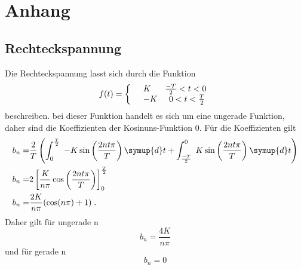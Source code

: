\section{Anhang}
\label{sec:Anhang}
\subsection{Rechteckspannung}
\label{sec:Rechteckspannung}
Die Rechteckspannung lasst sich durch die Funktion
\begin{equation*}
  f(t)=\left\{
  \begin{array}{l l}
    &K   \;\;\;\;\;\;\frac{-T}{2}<t<0 \\
    &-K  \;\;\;\;\;0<t<\frac{T}{2}
  \end{array}
  \right.
\end{equation*}
beschreiben. bei dieser Funktion handelt es sich um eine ungerade Funktion, daher
sind die Koeffizienten der Kosinuns-Funktion $0$. Für die Koeffizienten gilt
\begin{align*}
  b_n=&\frac{2}{T}\left(\int^{\frac{T}{2}}_0\;-K\sin\left(\frac{2nt\pi}{T}\right)\symup{d}t+
\int^0_{\frac{-T}{2}}\;K\sin\left(\frac{2nt\pi}{T}\right)\symup{d}t\right)\\
  b_n=&2\left[ \frac{K}{n\pi}\cos\left(\frac{2nt\pi}{T}\right)\right]^{\frac{T}{2}}_0\\
  b_n=&\frac{2K}{n\pi}(\cos(n\pi)+1)\;.
\end{align*}
Daher gilt für ungerade n
\begin{equation*}
  b_n=\frac{4K}{n\pi}
\end{equation*}
 und für gerade n
\begin{equation*}
  b_n=0
\end{equation*}
